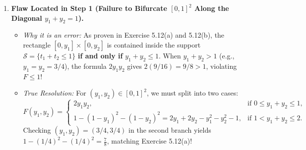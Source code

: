 \documentclass[11pt, letterpaper]{article}
\theoremstyle{definition}
\theoremstyle{remark}
\begin{document}
\begin{enumerate}[label=\textbf{Critique of Diagnostic Problem \arabic*:}, leftmargin=0pt, itemindent=0pt]
    \item \textbf{Flaw Located in Step 1 (Failure to Bifurcate $[0,1]^2$ Along the Diagonal $y_1 + y_2 = 1$).}
    \begin{itemize}
        \item \emph{Why it is an error:} As proven in Exercise 5.12(a) and 5.12(b), the rectangle $[0, y_1] \times [0, y_2]$ is contained inside the support $\mathcal{S} = \{t_1 + t_2 \le 1\}$ \textbf{if and only if} $y_1 + y_2 \le 1$. When $y_1 + y_2 > 1$ (e.g., $y_1 = y_2 = 3/4$), the formula $2y_1 y_2$ gives $2(9/16) = 9/8 > 1$, violating $F \le 1$!
        \item \emph{True Resolution:} For $(y_1, y_2) \in [0, 1]^2$, we must split into two cases:
        \[
            F(y_1, y_2) = \begin{cases}
                2 y_1 y_2, & \text{if } 0 \le y_1 + y_2 \le 1, \\
                1 - (1 - y_1)^2 - (1 - y_2)^2 = 2y_1 + 2y_2 - y_1^2 - y_2^2 - 1, & \text{if } 1 < y_1 + y_2 \le 2.
            \end{cases}
        \]
        Checking $(y_1, y_2) = (3/4, 3/4)$ in the second branch yields $1 - (1/4)^2 - (1/4)^2 = \frac{7}{8}$, matching Exercise 5.12(a)!
    \end{itemize}
\end{enumerate}
\end{document}
